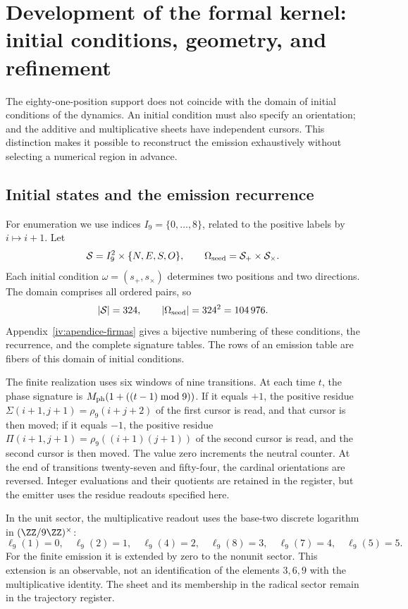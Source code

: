 \section{Development of the formal kernel: initial conditions, geometry, and refinement}
\label{sec:extension}

The eighty-one-position support does not coincide with the domain of initial conditions of the dynamics. An initial condition must also specify an orientation; and the additive and multiplicative sheets have independent cursors. This distinction makes it possible to reconstruct the emission exhaustively without selecting a numerical region in advance.

\subsection{Initial states and the emission recurrence}

For enumeration we use indices \(I_9=\{0,\ldots,8\}\), related to the positive labels by \(i\mapsto i+1\). Let
\[
 \mathcal S=I_9^2\times\{N,E,S,O\},\qquad
 \Omega_{\rm seed}=\mathcal S_+\times\mathcal S_\times.
\]
Each initial condition \(\omega=(s_+,s_\times)\) determines two positions and two directions. The domain comprises all ordered pairs, so
\begin{equation}
 |\mathcal S|=324,\qquad |\Omega_{\rm seed}|=324^2=104\,976.
 \label{eq:semillas}
\end{equation}
Appendix~\ref{iv:apendice-firmas} gives a bijective numbering
of these conditions, the recurrence, and the complete signature tables.
The rows of an emission table are fibers of this domain of initial conditions.

The finite realization uses six windows of nine transitions. At each time \(t\), the phase signature is \(M_{\rm ph}(1+((t-1)\bmod9))\). If it equals \(+1\), the positive residue \(\Sigma(i+1,j+1)=\rho_9(i+j+2)\) of the first cursor is read, and that cursor is then moved; if it equals \(-1\), the positive residue \(\Pi(i+1,j+1)=\rho_9((i+1)(j+1))\) of the second cursor is read, and the second cursor is then moved. The value zero increments the neutral counter. At the end of transitions twenty-seven and fifty-four, the cardinal orientations are reversed. Integer evaluations and their quotients are retained in the register, but the emitter uses the residue readouts specified here.

In the unit sector, the multiplicative readout uses the base-two discrete logarithm in \((\ZZ/9\ZZ)^\times\):
\[
 \ell_9(1)=0,\quad\ell_9(2)=1,\quad\ell_9(4)=2,\quad
 \ell_9(8)=3,\quad\ell_9(7)=4,\quad\ell_9(5)=5.
\]
For the finite emission it is extended by zero to the nonunit sector. This extension is an observable, not an identification of the elements \(3,6,9\) with the multiplicative identity. The sheet and its membership in the radical sector remain in the trajectory register.

